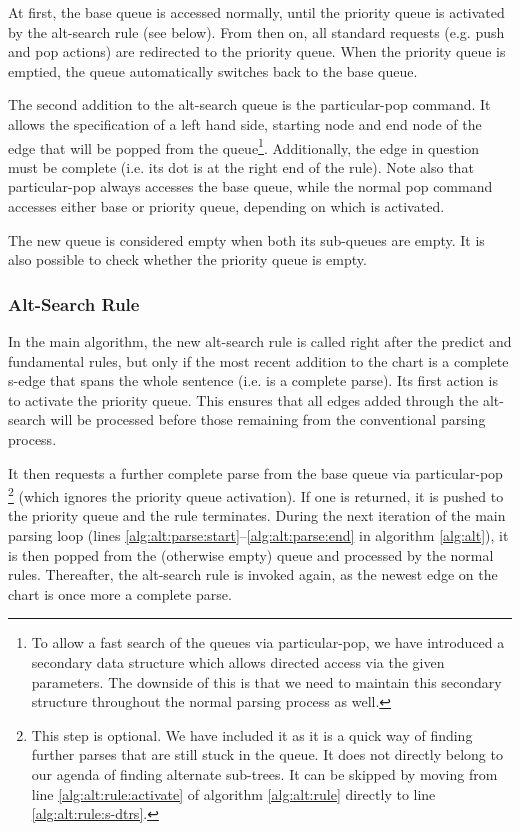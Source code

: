 \documentclass[11pt, titlepage, a4paper]{scrartcl}		%
\newcommand{\xmas}[1]{alt-search#1}
\newcommand{\XMas}[1]{Alt-Search#1}
\begin{document}
At first, the base queue is accessed normally, until the priority queue is activated by the \xmas{} rule (see below). From then on, all standard requests (e.g. push and pop actions) are redirected to the priority queue. When the priority queue is emptied, the queue automatically switches back to the base queue.

The second addition to the \xmas{} queue is the particular-pop command. It allows the specification of a left hand side, starting node and end node of the edge that will be popped from the queue\footnote{To allow a fast search of the queues via particular-pop, we have introduced a secondary data structure which allows directed access via the given parameters. The downside of this is that we need to maintain this secondary structure throughout the normal parsing process as well.}.
Additionally, the edge in question must be complete (i.e. its dot is at the right end of the rule).
Note also that particular-pop always accesses the base queue, while the normal pop command accesses either base or priority queue, depending on which is activated.

The new queue is considered empty when both its sub-queues are empty. It is also possible to check whether the priority queue is empty.

\subsubsection{\XMas{} Rule}
In the main algorithm, the new \xmas{} rule is called right after the predict and fundamental rules, but only if the most recent addition to the chart is a complete s-edge that spans the whole sentence (i.e. is a complete parse).
Its first action is to activate the priority queue. This ensures that all edges added through the \xmas{} will be processed before those remaining from the conventional parsing process.

It then requests a further complete parse from the base queue via particular-pop%
\footnote{This step is optional. We have included it as it is a quick way of finding further parses that are still stuck in the queue. It does not directly belong to our agenda of finding alternate sub-trees. It can be skipped by moving from line \ref{alg:alt:rule:activate}  of algorithm \ref{alg:alt:rule} directly to line \ref{alg:alt:rule:s-dtrs}.\label{foot:optional}}
(which ignores the priority queue activation).
If one is returned, it is pushed to the priority queue and the rule terminates.
During the next iteration of the main parsing loop (lines \ref{alg:alt:parse:start}--\ref{alg:alt:parse:end} in algorithm \ref{alg:alt}), it is then popped from the (otherwise empty) queue and processed by the normal rules. Thereafter, the \xmas{} rule is invoked again, as the newest edge on the chart is once more a complete parse.
\end{document}
